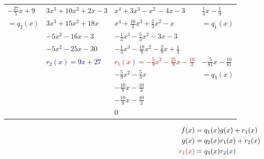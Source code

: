 \documentclass[13pt,fontset=mac]{ctexbeamer}
\newcommand{\blue}{\textcolor{blue}}
\newcommand{\red}{\textcolor{red}}
\begin{document}
\begin{frame}
	\begin{center}
				\renewcommand\arraystretch{1.3}
		\begin{tabular}{R{1.5cm}|R{3cm} |R{4cm}|L{1.7cm}}
			$-\frac{27}{5}x+9$ &{$3x^3+10x^2+2x-3$}&{$x^4+3x^3-x^2\, -4x-3$}&$\frac{1}{3}x-\frac{1}{9}$\\
			$=q_2(x)$ & $3x^3+15x^2+18x\quad $ & $x^4+\frac{10}{3}x^3+\frac{2}{3}x^2-x\qquad $& $=q_1(x)$\\
			&$ -5x^2-16x-3$ & $-\frac{1}{3}x^3-\frac{5}{3}x^2-3x-3\, $ & \\
			&$ -5x^2-25x-30$ & $-\frac{1}{3}x^3-\frac{10}{9}x^2-\frac{2}{9}x+\frac{1}{3}$ & \\
			&\blue{$r_2(x) = 9x+27$} & \red{$r_1(x) =-\frac{5}{9}x^2-\frac{25}{9}x-\frac{10}{3}$} & $-\frac{5}{81}x-\frac{10}{81}$\\
			& & $-\frac{5}{9}x^2-\frac{5}{3}x$ & $=q_3(x)$\\
			& & $-\frac{10}{9}x-\frac{10}{3}$ & \\
			& & $-\frac{10}{9}x-\frac{10}{3}$ & \\
			& & 0 & \\
		\end{tabular}
	\end{center}
	
	
	\begin{align*}
		{f(x)} & =q_1(x) {g(x)} +r_1(x)\\
		{g(x)} & =q_2(x) {r_1(x)} +r_2(x)\\
		\red{r_1(x)} & = q_3(x) \blue{r_2(x)}
	\end{align*}
	
\end{frame}
\end{document}
